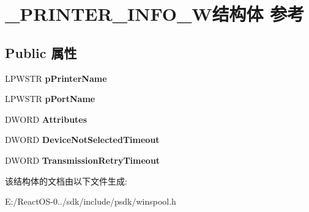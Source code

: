 \hypertarget{struct___p_r_i_n_t_e_r___i_n_f_o__5_w}{}\section{\+\_\+\+P\+R\+I\+N\+T\+E\+R\+\_\+\+I\+N\+F\+O\+\_\+W结构体 参考}
\label{struct___p_r_i_n_t_e_r___i_n_f_o__5_w}
\subsection*{Public 属性}
\begin{DoxyCompactItemize}
\item 
\mbox{\label{struct___p_r_i_n_t_e_r___i_n_f_o__5_w_a67d0584c29c42125cb91cbb15bc30d00}} 
L\+P\+W\+S\+TR {\bfseries p\+Printer\+Name}
\item 
\mbox{\label{struct___p_r_i_n_t_e_r___i_n_f_o__5_w_a87e02df63f552192eb9836cdef78795a}} 
L\+P\+W\+S\+TR {\bfseries p\+Port\+Name}
\item 
\mbox{\label{struct___p_r_i_n_t_e_r___i_n_f_o__5_w_aa30e5de97ae79b364e08538093fe16ed}} 
D\+W\+O\+RD {\bfseries Attributes}
\item 
\mbox{\label{struct___p_r_i_n_t_e_r___i_n_f_o__5_w_a6f9c1a09a7cb08c0cc86b1d7a8004451}} 
D\+W\+O\+RD {\bfseries Device\+Not\+Selected\+Timeout}
\item 
\mbox{\label{struct___p_r_i_n_t_e_r___i_n_f_o__5_w_a64c9dee35924ba13bb6a84fcddeed49b}} 
D\+W\+O\+RD {\bfseries Transmission\+Retry\+Timeout}
\end{DoxyCompactItemize}


该结构体的文档由以下文件生成\+:\begin{DoxyCompactItemize}
\item 
E\+:/\+React\+O\+S-\/0../sdk/include/psdk/winspool.\+h\end{DoxyCompactItemize}
